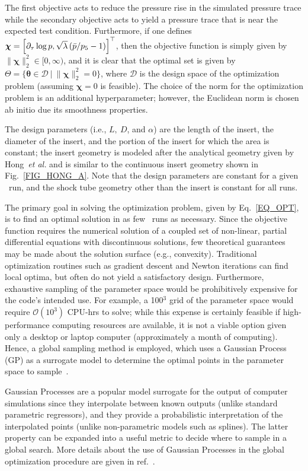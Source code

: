 The first objective acts to reduce the pressure rise in the simulated pressure trace while the secondary objective acts to yield a pressure trace that is near the expected test condition. Furthermore, if one defines $\boldsymbol\chi=\left[\partial_\tau\log p,\sqrt{\lambda}\left(\bar p/p_5-1\right)\right]^\top$, then the objective function is simply given by $\|\boldsymbol{\chi}\|_2^2\in[0,\infty)$, and it is clear that the optimal set is given by $\Theta=\{\boldsymbol{\theta}\in\mathcal D\ |\ \|\boldsymbol\chi\|_2^2=0\}$, where $\mathcal{D}$ is the design space of the optimization problem (assuming $\boldsymbol\chi = 0$ is feasible). The choice of the norm for the optimization problem is an additional hyperparameter; however, the Euclidean norm is chosen ab initio due its smoothness properties.

The design parameters (i.e., $L,\ D$, and $\alpha$) are the length of the insert, the diameter of the insert, and the portion of the insert for which the area is constant; the insert geometry is modeled after the analytical geometry given by Hong~\emph{et al.} and is similar to the continuous insert geometry shown in Fig.~\ref{FIG_HONG_A}. Note that the design parameters are constant for a given \stnshk\ run, and the shock tube geometry other than the insert is constant for all runs.

The primary goal in solving the optimization problem, given by Eq.~\ref{EQ_OPT}, is to find an optimal solution in as few \stnshk\ runs as necessary. Since the objective function requires the numerical solution of a coupled set of non-linear, partial differential equations with discontinuous solutions, few theoretical guarantees may be made about the solution surface (e.g., convexity). Traditional optimization routines such as gradient descent and Newton iterations can find local optima, but often do not yield a satisfactory design. Furthermore, exhaustive sampling of the parameter space would be prohibitively expensive for the code's intended use. For example, a 100$^3$ grid of the parameter space would require $\mathcal{O}(10^3)$ CPU-hrs to solve; while this expense is certainly feasible if high-performance computing resources are available, it is not a viable option given only a desktop or laptop computer (approximately a month of computing). Hence, a global sampling method is employed, which uses a Gaussian Process (GP) as a surrogate model to determine the optimal points in the parameter space to sample~\cite{SANTER_BOOK,RASMUSSEN_BOOK}. 

Gaussian Processes are a popular model surrogate for the output of computer simulations since they interpolate between known outputs (unlike standard parametric regressors), and they provide a probabilistic interpretation of the interpolated points (unlike non-parametric models such as splines). The latter property can be expanded into a useful metric to decide where to sample in a global search. More details about the use of Gaussian Processes in the global optimization procedure are given in ref.~\cite{GROGAN_THESIS18}.

